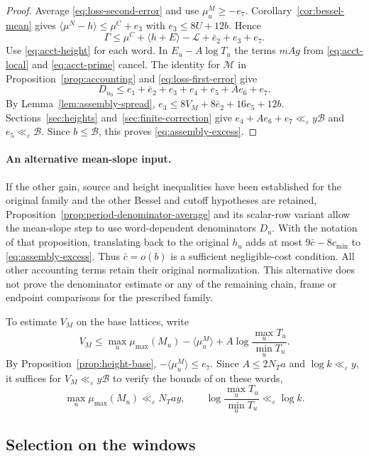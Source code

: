 \begin{proof}
Average \eqref{eq:loss-second-error} and use $\mu^M_u\ge-e_7$.
Corollary~\ref{cor:bessel-mean} gives
$\langle\mu^N-h\rangle\le\mu^C+e_3$ with $e_3\le8U+12b$. Hence
\[
 \Gamma\le \mu^C+\langle h+E\rangle-\mathcal L+\bar e_2+e_3+e_7 .
\]
Use \eqref{eq:acct-height} for each word. In
$E_u-A\log T_u$ the terms $mAg$ from \eqref{eq:acct-local}
and \eqref{eq:acct-prime} cancel. The identity for $\mathcal M$ in
Proposition~\ref{prop:accounting} and \eqref{eq:loss-first-error} give
\[
 D_{u_0}\le e_1+\bar e_2+e_3+e_4+e_5+Ae_6+e_7 .
\]
By Lemma~\ref{lem:assembly-spread},
$e_3\le8V_M+8\bar e_2+16e_5+12b$.
Sections~\ref{sec:heights} and~\ref{sec:finite-correction} give
$e_4+Ae_6+e_7\ll_\varepsilon y\mathcal B$ and
$e_5\ll_\varepsilon\mathcal B$. Since $b\le\mathcal B$, this proves
\eqref{eq:assembly-excess}.
\end{proof}

\paragraph{An alternative mean-slope input.}
If the other gain, source and height inequalities have been established
for the original family and the other Bessel and cutoff hypotheses
are retained, Proposition~\ref{prop:period-denominator-average} and its
scalar-row variant allow the mean-slope step to use word-dependent
denominators $D_u$.
With the notation of that proposition, translating back to the original
$h_u$ adds at most $9\bar c-8c_{\min}$ to
\eqref{eq:assembly-excess}. Thus $\bar c=o(b)$ is a sufficient
negligible-cost condition. All other accounting terms retain their
original normalization. This alternative does not prove the
denominator estimate or any of the remaining chain, frame or endpoint
comparisons for the prescribed family.

To estimate $V_M$ on the base lattices, write
\[
 V_M\le \max_u\mu_{\max}(M_u)-\langle\mu^M_u\rangle
                 +A\log\frac{\max_u T_u}{\min_u T_u}.
\]
By Proposition~\ref{prop:height-base}, $-\langle\mu^M_u\rangle\le e_7$.
Since $A\le2N_Ta$ and $\log k\ll_\varepsilon y$, it suffices for
$V_M\ll_\varepsilon y\mathcal B$ to verify the bounds of
\citep[Definition~18.9, (K7)--(K8)]{adriazola-grh} on these words,
\[
 \max_u\mu_{\max}(M_u)\ll_\varepsilon N_Ta y,\qquad
 \log\frac{\max_u T_u}{\min_u T_u}\ll_\varepsilon\log k .
\]

\subsection{Selection on the windows}

